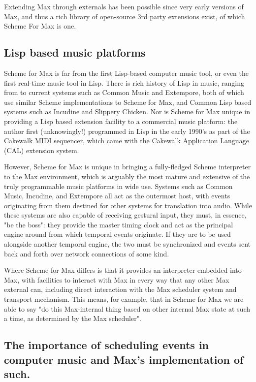 \documentclass[acmsmall]{acmart}
\begin{document}
Extending Max through externals has been possible since very early versions of Max, and thus a rich
library of open-source 3rd party extensions exist, of which Scheme For Max is one. 

\subsection{Lisp based music platforms}
Scheme for Max is far from the first Lisp-based computer music tool, or even
the first real-time music tool in Lisp. There is rich history of Lisp in music, 
ranging from %
to current systems such as Common Music and Extempore, both of which use similar 
Scheme implementations to Scheme for Max, and Common Lisp based systems such as
Incudine and Slippery Chicken. Nor is Scheme for Max unique in providing a Lisp
based extension facility to a commercial music platform: the author first (unknowingly!)
programmed in Lisp in the early 1990's as part of the Cakewalk MIDI sequencer,
which came with the Cakewalk Application Language (CAL) extension system.

However, Scheme for Max is unique in bringing a fully-fledged Scheme interpreter
to the Max environment, which is arguably the most mature and extensive of 
the truly programmable music platforms in wide use.
Systems such as Common Music, Incudine, and Extempore
all act as the outermost host, with events originating from them destined
for other systems for translation into audio. While these systems are also capable
of receiving gestural input, they must, in essence, "be the boss": they provide
the master timing clock and act as the principal engine around from which temporal
events originate. If they are to be used alongside another temporal engine, the two
must be synchronized and events sent back and forth over network connections of some kind.

Where Scheme for Max differs is that it provides an interpreter embedded into Max,
with facilities to interact with Max in every way that any other Max external can,
including direct interaction with the Max scheduler system and transport
mechanism. This means, for example, that in Scheme for Max we are able to say
"do this Max-internal thing based on other internal Max state at such a time,
as determined by the Max scheduler".  


\subsection{The importance of scheduling events in computer music and Max's implementation of such.}
\end{document}
